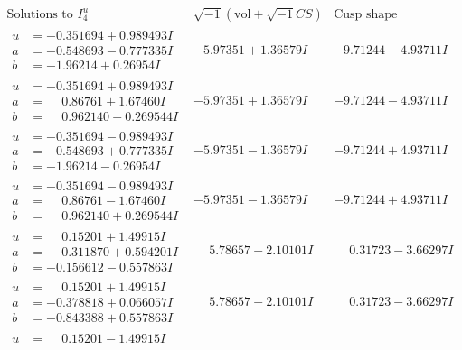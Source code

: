 \documentclass[1p]{elsarticle_modified}
\theoremstyle{definition}
\newcommand{\I}{\sqrt{-1}}
\begin{document}
$$\begin{array}{c|c|c}  
\text{Solutions to }I^u_{4}& \I (\text{vol} + \sqrt{-1}CS) & \text{Cusp shape}\\
 \hline 
\begin{aligned}
u &= -0.351694 + 0.989493 I \\
a &= -0.548693 - 0.777335 I \\
b &= -1.96214 + 0.26954 I\end{aligned}
 & -5.97351 + 1.36579 I & -9.71244 - 4.93711 I \\ \hline\begin{aligned}
u &= -0.351694 + 0.989493 I \\
a &= \phantom{-}0.86761 + 1.67460 I \\
b &= \phantom{-}0.962140 - 0.269544 I\end{aligned}
 & -5.97351 + 1.36579 I & -9.71244 - 4.93711 I \\ \hline\begin{aligned}
u &= -0.351694 - 0.989493 I \\
a &= -0.548693 + 0.777335 I \\
b &= -1.96214 - 0.26954 I\end{aligned}
 & -5.97351 - 1.36579 I & -9.71244 + 4.93711 I \\ \hline\begin{aligned}
u &= -0.351694 - 0.989493 I \\
a &= \phantom{-}0.86761 - 1.67460 I \\
b &= \phantom{-}0.962140 + 0.269544 I\end{aligned}
 & -5.97351 - 1.36579 I & -9.71244 + 4.93711 I \\ \hline\begin{aligned}
u &= \phantom{-}0.15201 + 1.49915 I \\
a &= \phantom{-}0.311870 + 0.594201 I \\
b &= -0.156612 - 0.557863 I\end{aligned}
 & \phantom{-}5.78657 - 2.10101 I & \phantom{-}0.31723 - 3.66297 I \\ \hline\begin{aligned}
u &= \phantom{-}0.15201 + 1.49915 I \\
a &= -0.378818 + 0.066057 I \\
b &= -0.843388 + 0.557863 I\end{aligned}
 & \phantom{-}5.78657 - 2.10101 I & \phantom{-}0.31723 - 3.66297 I \\ \hline\begin{aligned}
u &= \phantom{-}0.15201 - 1.49915 I \\

\end{aligned}
\end{array}$$
\end{document}
